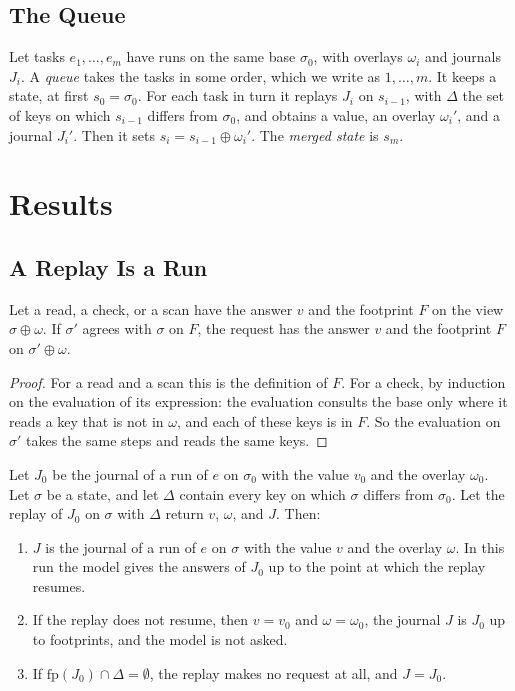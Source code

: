 \documentclass[acmsmall,nonacm,screen]{acmart}
\newcommand{\fp}[1]{\mathrm{fp}(#1)}
\newcommand{\upd}{\oplus}
\begin{document}
\subsection{The Queue}

Let tasks $e_1, \ldots, e_m$ have runs on the same base $\sigma_0$, with overlays $\omega_i$
and journals $J_i$. A \emph{queue} takes the tasks in some order, which we write as
$1, \ldots, m$. It keeps a state, at first $s_0 = \sigma_0$. For each task in turn it replays
$J_i$ on $s_{i-1}$, with $\Delta$ the set of keys on which $s_{i-1}$ differs from $\sigma_0$,
and obtains a value, an overlay $\omega_i'$, and a journal $J_i'$. Then it sets
$s_i = s_{i-1} \upd \omega_i'$. The \emph{merged state} is $s_m$.

\section{Results}
\label{sec:results}

\subsection{A Replay Is a Run}

\begin{lemma}[Footprints]
\label{lem:footprint}
Let a read, a check, or a scan have the answer $v$ and the footprint $F$ on the view
$\sigma \upd \omega$. If $\sigma'$ agrees with $\sigma$ on $F$, the request has the answer
$v$ and the footprint $F$ on $\sigma' \upd \omega$.
\end{lemma}

\begin{proof}
For a read and a scan this is the definition of $F$. For a check, by induction on the
evaluation of its expression: the evaluation consults the base only where it reads a key that
is not in $\omega$, and each of these keys is in $F$. So the evaluation on $\sigma'$ takes
the same steps and reads the same keys.
\end{proof}

\begin{theorem}
\label{thm:replay}
Let $J_0$ be the journal of a run of $e$ on $\sigma_0$ with the value $v_0$ and the overlay
$\omega_0$. Let $\sigma$ be a state, and let $\Delta$ contain every key on which $\sigma$
differs from $\sigma_0$. Let the replay of $J_0$ on $\sigma$ with $\Delta$ return $v$,
$\omega$, and $J$. Then:
\begin{enumerate}
\item $J$ is the journal of a run of $e$ on $\sigma$ with the value $v$ and the overlay
  $\omega$. In this run the model gives the answers of $J_0$ up to the point at which the
  replay resumes.
\item If the replay does not resume, then $v = v_0$ and $\omega = \omega_0$, the journal $J$
  is $J_0$ up to footprints, and the model is not asked.
\item If $\fp{J_0} \cap \Delta = \emptyset$, the replay makes no request at all, and
  $J = J_0$.
\end{enumerate}
\end{theorem}
\end{document}
